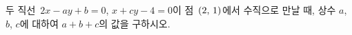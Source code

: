 두 직선~$2x-ay+b=0$, $x+cy-4=0$이 점~$(2,\mkern3mu 1)$에서 수직으로 만날 때, 상수 $a$, $b$, $c$에 대하여 $a+b+c$의 값을 구하시오.
